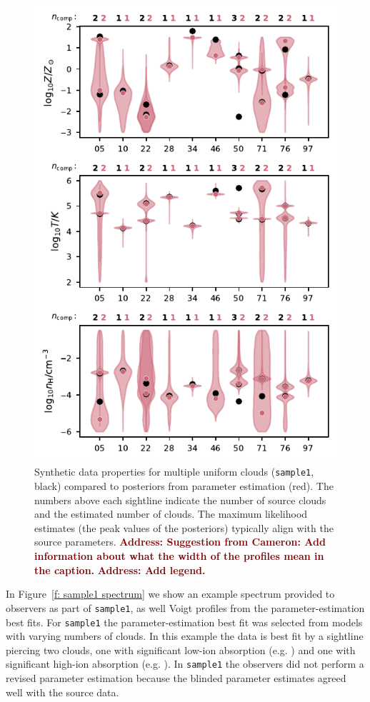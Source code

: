 \documentclass[fleqn,usenatbib]{mnras}
\newcommand{\todo}[1]{\textcolor{Maroon}{\textbf{Address: #1}}}
\begin{document}
\begin{figure}
    \centering
    \includegraphics[width=\columnwidth]{figures/sample1/comparison.pdf}
    \caption{
    Synthetic data properties for multiple uniform clouds (\texttt{sample1}, black) compared to posteriors from parameter estimation (red).
    The numbers above each sightline indicate the number of source clouds and the estimated number of clouds.
    The maximum likelihood estimates (the peak values of the posteriors) typically align with the source parameters.
    \todo{Suggestion from Cameron: Add information about what the width of the profiles mean in the caption.}
    \todo{Add legend.}
    }
    \label{f: sample1 violin}
\end{figure}

In Figure~\ref{f: sample1 spectrum} we show an example spectrum provided to observers as part of \texttt{sample1},
as well Voigt profiles from the parameter-estimation best fits.
For \texttt{sample1} the parameter-estimation best fit was selected from models with varying numbers of clouds.
In this example the data is best fit by a sightline piercing two clouds, one with significant low-ion absorption (e.g. )  and one with significant high-ion absorption (e.g. ).
In \texttt{sample1} the observers did not perform a revised parameter estimation because the blinded parameter estimates agreed well with the source data.
\end{document}

